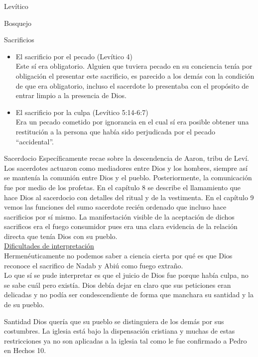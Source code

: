 \begin{section}{Levítico}
\begin{subsection}{Bosquejo}
\begin{subsubsection}{Sacrificios}
\begin{itemize}
			\item El sacrificio por el pecado (Levítico 4)\\
				Este sí era obligatorio. Alguien que tuviera pecado en su conciencia tenía por obligación el presentar este sacrificio, es parecido a los demás con la condición de que era obligatorio, incluso el sacerdote lo presentaba con el propósito de entrar limpio a la presencia de Dios.
			\item El sacrificio por la culpa (Levítico 5:14-6:7)\\
				Era un pecado cometido por ignorancia en el cual sí era posible obtener una restitución a la persona que había sido perjudicada por el pecado ``accidental''.


		\end{itemize}
	\end{subsubsection}
	\begin{subsubsection}{Sacerdocio}
		Específicamente recae sobre la descendencia de Aaron, tribu de Leví. Los sacerdotes actuaron como mediadores entre Dios y los hombres, siempre así se mantenía la comunión entre Dios y el pueblo. Posteriormente, la comunicación fue por medio de los profetas. En el capítulo 8 se describe el llamamiento que hace Dios al sacerdocio con detalles del ritual y de la vestimenta. En el capítulo 9 vemos las funciones del sumo sacerdote recién ordenado que incluso hace sacrificios por sí mismo.\newpage
		La manifestación visible de la aceptación de dichos sacrificos era el fuego consumidor pues era una clara evidencia de la relación directa que tenía Dios con su pueblo.\\
		\underline{Dificultades de interpretación}\\
Hermenéuticamente no podemos saber a ciencia cierta por qué es que Dios reconoce el sacrifico de Nadab y Abiú como fuego extraño.\\
Lo que sí se pude interpretar es que el juicio de Dios fue porque había culpa, no se sabe cuál pero existía. Dios debía dejar en claro que sus peticiones eran delicadas y no podía ser condescendiente de forma que manchara su santidad y la de su pueblo.
	\end{subsubsection}
	\begin{subsubsection}{Santidad}
		Dios quería que su pueblo se distinguiera de los demás por sus costumbres. La iglesia está bajo la dispensación cristiana y muchas de estas restricciones ya no son aplicadas a la iglesia tal como le fue confirmado a Pedro en Hechos 10.\\

\end{subsubsection}
\end{subsection}
\end{section}

